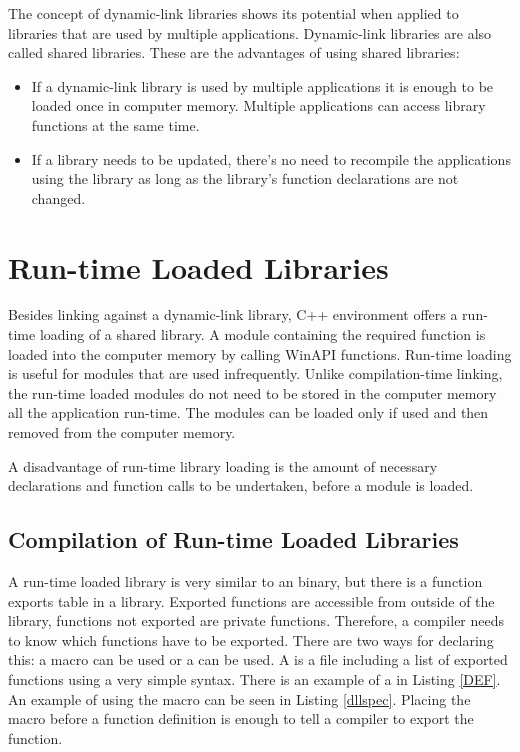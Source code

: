The concept of dynamic-link libraries shows its potential when applied to libraries that are used by multiple applications. Dynamic-link libraries are also called shared libraries. These are the advantages of using shared libraries:

\begin{itemize}
\item If a dynamic-link library is used by multiple applications it is enough to be loaded once in computer memory. Multiple applications can access library functions at the same time.
\item If a library needs to be updated, there's no need to recompile the applications using the library as long as the library's function declarations are not changed.
\end{itemize}


\section{Run-time Loaded Libraries}

Besides linking against a dynamic-link library, C++ environment offers a run-time loading of a shared library. A module containing the required function is loaded into the computer memory by calling WinAPI functions. Run-time loading is useful for modules that are used infrequently. Unlike compilation-time linking, the run-time loaded modules do not need to be stored in the computer memory all the application run-time. The modules can be loaded only if used and then removed from the computer memory.

A disadvantage of run-time library loading is the amount of necessary declarations and function calls to be undertaken, before a module is loaded.

\subsection{Compilation of Run-time Loaded Libraries}


A run-time loaded  library is very similar to an  binary, but there is a function exports table in a  library\cite{msdn}. Exported functions are accessible from outside of the library, functions not exported are private functions. Therefore, a compiler needs to know which functions have to be exported. There are two ways for declaring this: a  macro can be used or a  can be used. A  is a file including a list of exported functions using a very simple syntax. There is an example of a  in Listing \ref{DEF}. An example of using the  macro can be seen in Listing \ref{dllspec}. Placing the macro before a function definition is enough to tell a compiler to export the function.

